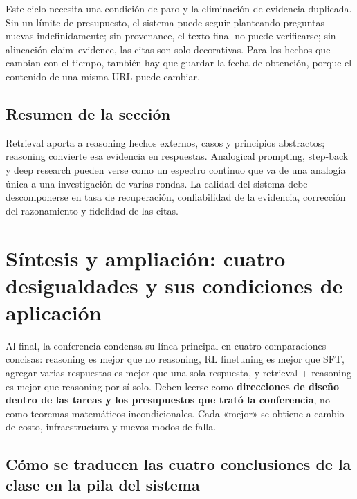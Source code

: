 \documentclass[a4paper]{article}
\begin{document}
Este ciclo necesita una condición de paro y la eliminación de evidencia duplicada. Sin un límite de presupuesto, el sistema puede seguir planteando preguntas nuevas indefinidamente; sin provenance, el texto final no puede verificarse; sin alineación claim--evidence, las citas son solo decorativas. Para los hechos que cambian con el tiempo, también hay que guardar la fecha de obtención, porque el contenido de una misma URL puede cambiar.


\subsection{Resumen de la sección}

Retrieval aporta a reasoning hechos externos, casos y principios abstractos; reasoning convierte esa evidencia en respuestas. Analogical prompting, step-back y deep research pueden verse como un espectro continuo que va de una analogía única a una investigación de varias rondas. La calidad del sistema debe descomponerse en tasa de recuperación, confiabilidad de la evidencia, corrección del razonamiento y fidelidad de las citas.
\section{Síntesis y ampliación: cuatro desigualdades y sus condiciones de aplicación}

Al final, la conferencia condensa su línea principal en cuatro comparaciones concisas: reasoning es mejor que no reasoning, RL finetuning es mejor que SFT, agregar varias respuestas es mejor que una sola respuesta, y retrieval + reasoning es mejor que reasoning por sí solo. Deben leerse como \textbf{direcciones de diseño dentro de las tareas y los presupuestos que trató la conferencia}, no como teoremas matemáticos incondicionales. Cada «mejor» se obtiene a cambio de costo, infraestructura y nuevos modos de falla.

\subsection{Cómo se traducen las cuatro conclusiones de la clase en la pila del sistema}
\end{document}
